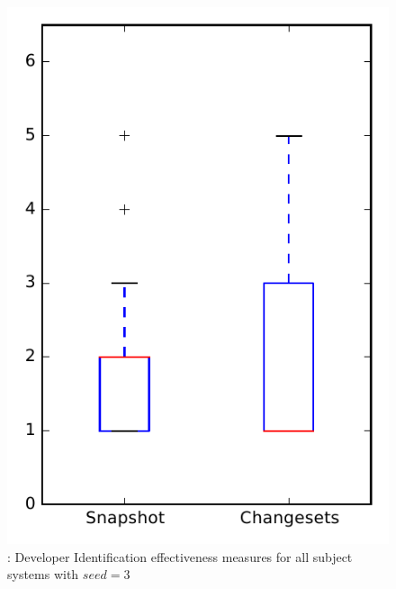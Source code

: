 
\begin{figure}
\centering
\includegraphics[height=0.4\textheight]{figures/dit_seed/rq1_overview_3}
\caption{\rtwo: Developer Identification effectiveness measures for all subject systems with $seed=3$}
\label{fig:dit_seed:rq1:overview}
\end{figure}
